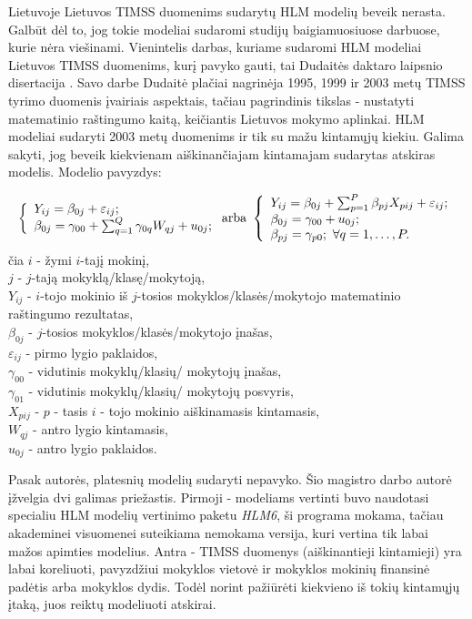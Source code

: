 \documentclass[12pt,a4paper]{article}
\begin{document}
\indent Lietuvoje Lietuvos TIMSS duomenims sudarytų HLM modelių beveik nerasta. Galbūt dėl to, jog tokie modeliai sudaromi studijų baigiamuosiuose darbuose, kurie nėra viešinami. Vienintelis darbas, kuriame sudaromi HLM modeliai Lietuvos TIMSS duomenims, kurį pavyko gauti, tai Dudaitės daktaro laipsnio disertacija \cite{liet2003}. Savo darbe Dudaitė plačiai nagrinėja 1995, 1999 ir 2003 metų TIMSS tyrimo duomenis įvairiais aspektais, tačiau pagrindinis tikslas - nustatyti matematinio raštingumo kaitą, keičiantis Lietuvos mokymo aplinkai. HLM modeliai sudaryti 2003 metų duomenims ir tik su mažu kintamųjų kiekiu. Galima sakyti, jog beveik kiekvienam aiškinančiajam kintamajam sudarytas atskiras modelis. Modelio pavyzdys:
\begin{small}
\[
\left\{
\begin{array}{l l}
Y_{ij} = \beta_{0j}+\varepsilon_{ij}; \\
\beta_{0j} = \gamma_{00} + \sum^Q_{q=1}\gamma_{0q}W_{qj}+u_{0j};
\end{array} \right.
\text{arba}\
\left\{
\begin{array}{l l}
Y_{ij} = \beta_{0j}+\sum^P_{p=1}\beta_{pj}X_{pij}+\varepsilon_{ij}; \\
\beta_{0j} = \gamma_{00} + u_{0j};\\
\beta_{pj} = \gamma_{p0}; \ \forall q=1,\dots,P.
\end{array} \right.
\]
čia $i$ - žymi $i$-tajį mokinį,\\
$j$ - $j$-tają mokyklą/klasę/mokytoją,\\
$Y_{ij}$ - $i$-tojo mokinio iš $j$-tosios mokyklos/klasės/mokytojo matematinio raštingumo rezultatas,\\
$\beta_{0j}$ - $j$-tosios mokyklos/klasės/mokytojo įnašas,\\
$\varepsilon_{ij}$ - pirmo lygio paklaidos,\\
$\gamma_{00}$ - vidutinis mokyklų/klasių/ mokytojų įnašas,\\
$\gamma_{01}$ - vidutinis mokyklų/klasių/ mokytojų posvyris,\\
$X_{pij}$ - $p$ - tasis $i$ - tojo mokinio aiškinamasis kintamasis,\\
$W_{qj}$ - antro lygio kintamasis, \\
$u_{0j}$ - antro lygio paklaidos.
\end{small}

\indent Pasak autorės, platesnių modelių sudaryti nepavyko. Šio magistro darbo autorė įžvelgia dvi galimas priežastis. Pirmoji - modeliams vertinti buvo naudotasi specialiu HLM modelių vertinimo paketu \textit{HLM6}, ši programa mokama, tačiau akademinei visuomenei suteikiama nemokama versija, kuri vertina tik labai mažos apimties modelius. Antra - TIMSS duomenys (aiškinantieji kintamieji) yra labai koreliuoti, pavyzdžiui mokyklos vietovė ir mokyklos mokinių finansinė padėtis arba mokyklos dydis. Todėl norint pažiūrėti kiekvieno iš tokių kintamųjų įtaką, juos reiktų modeliuoti atskirai.
\end{document}
